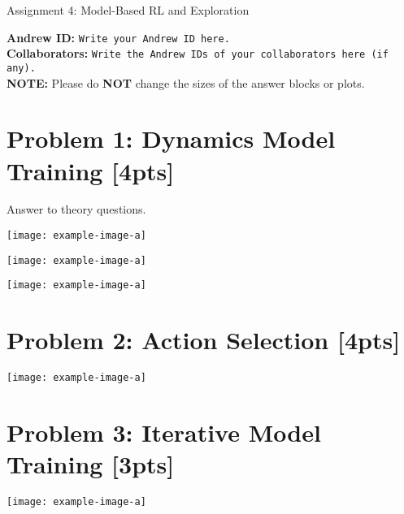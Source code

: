 \documentclass{article}
\begin{document}

\begin{centering}
    {\Large Assignment 4: Model-Based RL and Exploration
} \\
    \vspace{.25cm}
\end{centering}
\vspace{0.25cm}

\textbf{Andrew ID:} \texttt{Write your Andrew ID here.} \\
\textbf{Collaborators:} \texttt{Write the Andrew IDs of your collaborators here (if any).}\\ 
\textbf{NOTE:} Please do \textbf{NOT} change the sizes of the answer blocks or plots.

\setcounter{section}{0}
\section{Problem 1: Dynamics Model Training [4pts]}
Answer to theory questions.\\
\begin{answer}[title=Plot 1,height=9.5cm,width=\linewidth]
\centering
\texttt{[image: example-image-a]}
\end{answer}

\begin{answer}[title=Plot 2,height=9.5cm,width=\linewidth]
\centering
\texttt{[image: example-image-a]}
\end{answer}

\begin{answer}[title=Plot 3,height=9.5cm,width=\linewidth]
\centering
\texttt{[image: example-image-a]}
\end{answer}

\section{Problem 2: Action Selection [4pts]}
\begin{answer}[title=Plot 1,height=9.5cm,width=\linewidth]
\centering
\texttt{[image: example-image-a]}
\end{answer}



\section{Problem 3: Iterative Model Training [3pts]}
\begin{answer}[title=Plot 1,height=9.5cm,width=\linewidth]
\centering
\texttt{[image: example-image-a]}
\end{answer}
\end{document}
